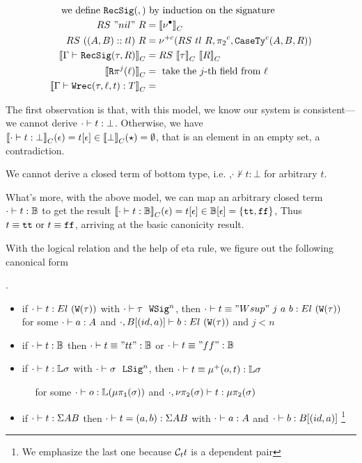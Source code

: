 \begin{align*}
  \text{we define } \texttt{RecSig}({},{}) &\text{ by induction on the signature} \\
  RS~"nil"~R &= {{\llbracket {\ensuremath{\nu^\bullet}} \rrbracket}_C} \\
  RS~((A, B) :: tl)~R &= \nu^{+c}({RS~tl~R},{{\pi_2}^c},{\texttt{CaseTy}^c({A},{B},{R})}) \\
  {{\llbracket {\ensuremath{ {\Gamma} \vdash_{} {\texttt{RecSig}({\tau},{R})} }} \rrbracket}_C} &= RS~{{\llbracket {\tau} \rrbracket}_C}~{{\llbracket {R} \rrbracket}_C} \\
  {{\llbracket {\ensuremath{\texttt{R}\pi^{j}({\ell})}} \rrbracket}_C} &= \text{ take the $j$-th field from } \ell \\
  {{\llbracket {\ensuremath{ {\Gamma} \vdash {\ensuremath{\texttt{Wrec}({\tau},{\ell},{t})}} : {T} }} \rrbracket}_C} &= \\
\end{align*}


The first observation is that, with this model, we know our system is consistent---we cannot derive $ {\cdot} \vdash {t} : {\bot} $. Otherwise, we have ${{\llbracket {\ensuremath{ {\cdot} \vdash {t} : {\bot} }} \rrbracket}_C}(\epsilon) = {t}\!\left[{\epsilon}\right] \in {{\llbracket {\bot} \rrbracket}_C}(\star) = \emptyset$, that is an element in an empty set, a contradiction.

\begin{theorem}[Consistency]
  We cannot derive a closed term of bottom type, i.e. ,$\cdot \not \vdash t : \bot$ for arbitrary $t$.
\end{theorem}

What's more, with the above model, we can map an arbitrary closed term $ {\cdot} \vdash {t} : {\mathbb{B}} $ to get the result ${{\llbracket {\ensuremath{ {\cdot} \vdash {t} : {\mathbb{B}} }} \rrbracket}_C}(\epsilon) = {t}\!\left[{\epsilon}\right] \in {\ensuremath{\mathbb{B}}}\!\left[{\epsilon}\right] = \{\texttt{tt}, \texttt{ff}\}$, Thus $t \equiv \texttt{tt} \text{ or } t \equiv\texttt{ff}$, arriving at the basic canonicity result.


With the logical relation and the help of eta rule, we figure out the following canonical form
\begin{theorem}.
  \begin{itemize}
    \item if $ {\cdot} \vdash {t} : {El~(\texttt{W}({\tau}))} $ with $ {\cdot} \vdash {\tau} \ \ \texttt{WSig}^{n} $, then $ {\cdot} \vdash {t \equiv "Wsup"~j~a~b} : {El~(\texttt{W}({\tau}))} $ for some $ {\cdot} \vdash {a} : {A} $ and $ {\cdot, B[(id, a)]} \vdash {b} : {El~(\texttt{W}({\tau}))} $ and $j < n$
    \item if $ {\cdot} \vdash {t} : {\mathbb{B}} $ then $ {\cdot} \vdash {t \equiv "tt"} : {\mathbb{B}} $ or $ {\cdot} \vdash {t \equiv "ff"} : {\mathbb{B}} $ 
    \item if $ {\cdot} \vdash {t} : {\mathbb{L}\sigma} $ with $ {\cdot} \vdash {\sigma} \ \ \texttt{LSig}^{n} $, then $ {\cdot} \vdash {t \equiv \ensuremath{\mu^+({o},{t})}} : {\mathbb{L}\sigma} $ 
    
      $\quad$ for some $ {\cdot} \vdash {o} : {\mathbb{L}(\mu\pi_{\texttt{1}}({\sigma}))} $ and $ {\cdot, \nu\pi_{\texttt{2}}({\sigma})} \vdash {t} : {\mu\pi_{\texttt{2}}({\sigma})} $
    \item if $ {\cdot} \vdash {t} : {\Sigma A B} $ then $ {\cdot} \vdash {t = (a, b)} : {\Sigma A B} $ with $ {\cdot} \vdash {a} : {A} $ and $ {\cdot} \vdash {b} : {B[(id, a)]} $
    \footnote{We emphasize the last one because $\mathcal{C}_t t$ is a dependent pair}
  \end{itemize}
\end{theorem}

